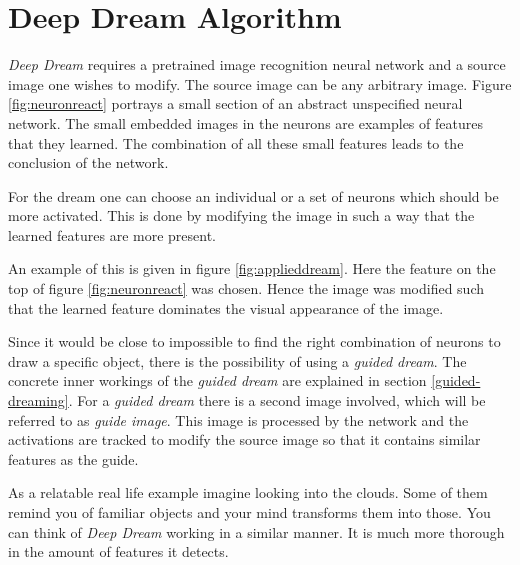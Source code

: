 

\section{Deep Dream Algorithm}
\label{sec:how}
\label{sec:visual-aspects}

\emph{Deep Dream} requires a pretrained image recognition neural network and a source image one wishes to modify.
The source image can be any arbitrary image.
Figure \ref{fig:neuronreact} portrays a small section of an abstract unspecified neural network.
The small embedded images in the neurons are examples of features that they learned.
The combination of all these small features leads to the conclusion of the network.

For the dream one can choose an individual or a set of neurons which should be more activated.
This is done by modifying the image in such a way that the learned features are more present.

An example of this is given in figure \ref{fig:applieddream}.
Here the feature on the top of figure \ref{fig:neuronreact} was chosen.
Hence the image was modified such that the learned feature dominates the visual appearance of the image.

Since it would be close to impossible to find the right combination of neurons to draw a specific object, there is the possibility of using a \textit{guided dream}.
The concrete inner workings of the \textit{guided dream} are explained in section \ref{guided-dreaming}.
For a \textit{guided dream} there is a second image involved, which will be referred to as \textit{guide image}.
This image is processed by the network and the activations are tracked to modify the source image so that it contains similar features as the guide.

As a relatable real life example imagine looking into the clouds.
Some of them remind you of familiar objects and your mind transforms them into those.
You can think of \emph{Deep Dream} working in a similar manner.
It is much more thorough in the amount of features it detects.

